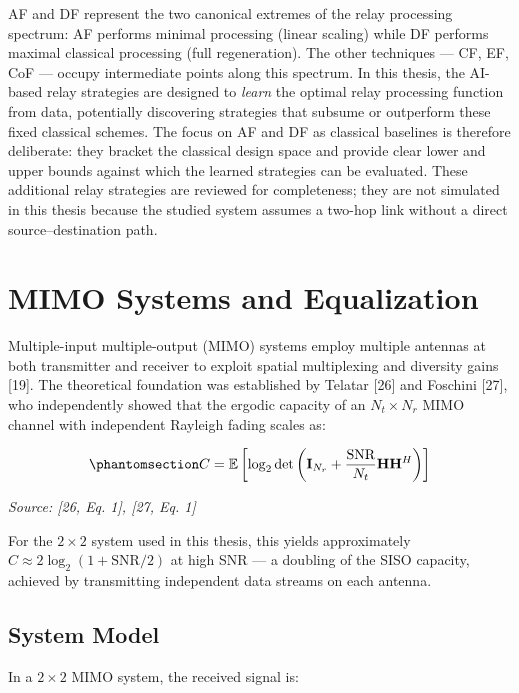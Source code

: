 AF and DF represent the two canonical extremes of the relay processing spectrum: AF performs minimal processing (linear scaling) while DF performs maximal classical processing (full regeneration). The other techniques --- CF, EF, CoF --- occupy intermediate points along this spectrum. In this thesis, the AI-based relay strategies are designed to \emph{learn} the optimal relay processing function from data, potentially discovering strategies that subsume or outperform these fixed classical schemes. The focus on AF and DF as classical baselines is therefore deliberate: they bracket the classical design space and provide clear lower and upper bounds against which the learned strategies can be evaluated. These additional relay strategies are reviewed for completeness; they are not simulated in this thesis because the studied system assumes a two-hop link without a direct source--destination path.

\section{MIMO Systems and Equalization}\label{sec:mimo-systems-and-equalization}

Multiple-input multiple-output (MIMO) systems employ multiple antennas at both transmitter and receiver to exploit spatial multiplexing and diversity gains {[}19{]}. The theoretical foundation was established by Telatar {[}26{]} and Foschini {[}27{]}, who independently showed that the ergodic capacity of an \(N_t \times N_r\) MIMO channel with independent Rayleigh fading scales as:

\begin{equation}\protect\phantomsection\label{eq:mimo-capacity}{C = \mathbb{E}\left[\log_2 \det\left(\mathbf{I}_{N_r} + \frac{\text{SNR}}{N_t}\mathbf{H}\mathbf{H}^H\right)\right]
}\end{equation} \par{\small\textit{Source: [26, Eq. 1], [27, Eq. 1]}}

For the \(2 \times 2\) system used in this thesis, this yields approximately \(C \approx 2\log_2(1 + \text{SNR}/2)\) at high SNR --- a doubling of the SISO capacity, achieved by transmitting independent data streams on each antenna.

\subsection{System Model}\label{sec:system-model}

In a \(2 \times 2\) MIMO system, the received signal is:

